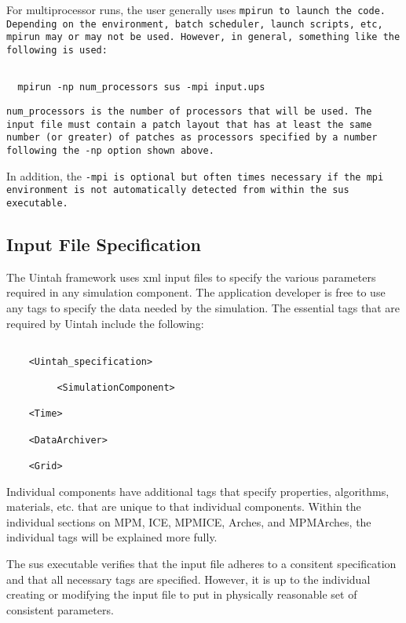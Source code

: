 For multiprocessor runs, the user generally uses \tt mpirun
\normalfont to launch the code.  Depending on the environment, batch
scheduler, launch scripts, etc, \tt mpirun \normalfont may or may not
be used.  However, in general, something like the following is used:
\begin{Verbatim}[fontsize=\footnotesize]

  mpirun -np num_processors sus -mpi input.ups

\end{Verbatim}

\tt num\_processors \normalfont is the number of processors that will
be used.  The input file must contain a patch layout that has at least
the same number (or greater) of patches as processors specified by a
number following the -np option shown above.

In addition, the \tt -mpi \normalfont is optional but often times
necessary if the mpi environment is not automatically detected from
within the sus executable.


\subsection{Input File Specification} \label{Sec:InputFileSpecification}

The Uintah framework uses xml input files to specify the various
parameters required in any simulation component.  The application
developer is free to use any tags to specify the data needed by the
simulation.  The essential tags that are required by Uintah include
the following:

\begin{verbatim}

	<Uintah_specification>

         <SimulationComponent>

	<Time>

	<DataArchiver>

	<Grid>

\end{verbatim}


Individual components have additional tags that specify properties,
algorithms, materials, etc. that are unique to that individual
components.  Within the individual sections on MPM, ICE, MPMICE,
Arches, and MPMArches, the individual tags will be explained more
fully.

The sus executable verifies that the input file adheres to a consitent
specification and that all necessary tags are specified.  However, it
is up to the individual creating or modifying the input file to put in
physically reasonable set of consistent parameters.


